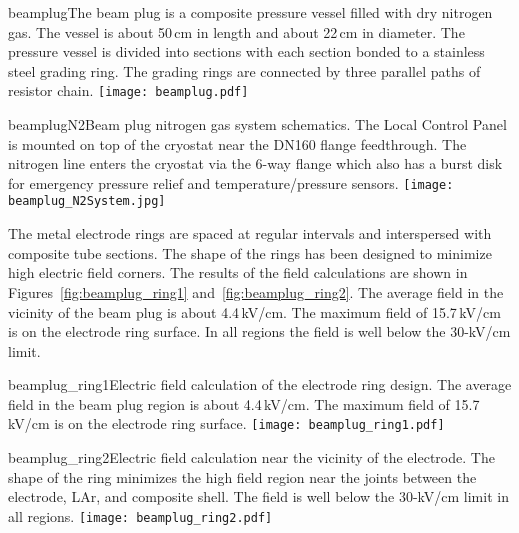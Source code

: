 \begin{cdrfigure}{beamplug}{The beam plug is a  composite pressure vessel filled with dry nitrogen gas. The vessel is about 50\,cm in length and about 22\,cm in diameter. The pressure vessel is divided into sections with each section bonded to a stainless steel grading ring. The grading rings are connected by three parallel paths of resistor chain.}
  \texttt{[image: beamplug.pdf]}
\end{cdrfigure}


\begin{cdrfigure}{beamplugN2}{Beam plug nitrogen gas system schematics. The Local Control Panel is mounted on top of the cryostat near the DN160 flange feedthrough. The nitrogen line enters the cryostat via the 6-way flange which also has a burst disk for emergency pressure relief and temperature/pressure sensors.  }
  \texttt{[image: beamplug\_N2System.jpg]}
\end{cdrfigure}

The metal electrode rings are spaced at regular intervals and interspersed with composite tube sections. The shape of the rings has been designed to minimize high electric field corners. The results of the field calculations are shown in Figures~\ref{fig:beamplug_ring1} and~\ref{fig:beamplug_ring2}. The average field in the vicinity of the beam plug is about 4.4\,kV/cm. The maximum field of 15.7\,kV/cm is on the electrode ring surface. In all regions the field is well below the 30-kV/cm limit.

\begin{cdrfigure}{beamplug_ring1}{Electric field calculation of the electrode ring design. The average field in the beam plug region is about 4.4\,kV/cm. The maximum field of 15.7\,kV/cm is on the electrode ring surface. }
  \texttt{[image: beamplug\_ring1.pdf]}
\end{cdrfigure}

\begin{cdrfigure}{beamplug_ring2}{Electric field calculation near the vicinity of the electrode. The shape of the ring minimizes the high field region near the joints between the electrode, LAr, and composite shell. The field is well below the 30-kV/cm limit in all regions.}
  \texttt{[image: beamplug\_ring2.pdf]}
\end{cdrfigure}

